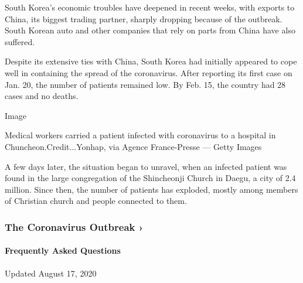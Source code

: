 South Korea's economic troubles have deepened in recent weeks, with
exports to China, its biggest trading partner, sharply dropping because
of the outbreak. South Korean auto and other companies that rely on
parts from China have also suffered.

Despite its extensive ties with China, South Korea had initially
appeared to cope well in containing the spread of the coronavirus. After
reporting its first case on Jan. 20, the number of patients remained
low. By Feb. 15, the country had 28 cases and no deaths.

Image

Medical workers carried a patient infected with coronavirus to a
hospital in Chuncheon.Credit...Yonhap, via Agence France-Presse ---
Getty Images

A few days later, the situation began to unravel, when an infected
patient was found in the large congregation of the Shincheonji Church in
Daegu, a city of 2.4 million. Since then, the number of patients has
exploded, mostly among members of Christian church and people connected
to them.

\href{https://www.nytimes3xbfgragh.onion/news-event/coronavirus?action=click\&pgtype=Article\&state=default\&region=MAIN_CONTENT_3\&context=storylines_faq}{}

\hypertarget{the-coronavirus-outbreak-}{%
\subsubsection{The Coronavirus Outbreak
›}\label{the-coronavirus-outbreak-}}

\hypertarget{frequently-asked-questions}{%
\paragraph{Frequently Asked
Questions}\label{frequently-asked-questions}}

Updated August 17, 2020

